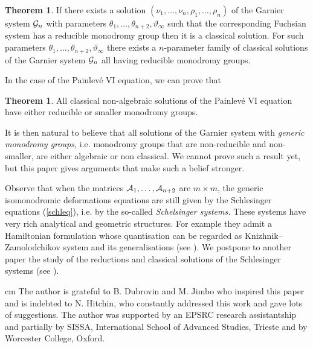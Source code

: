 \documentclass[12pt]{article}
\def\thi{{\vartheta_\infty}}
\theoremstyle{definition}
\theoremstyle{theorem}
\newtheorem{thm}[df]{Theorem}
\begin{document}
\begin{thm}
If there exists a solution $(\nu_1,\dots,\nu_n,\rho_1,\dots,\rho_n)$
of the Garnier system ${\cal G}_{n}$ with parameters 
$\theta_1,\dots,\theta_{n+2},\thi$ such that the corresponding 
Fuchsian system has a reducible monodromy group then it is a 
classical solution. For such parameters 
$\theta_1,\dots,\theta_{n+2},\thi$ there exists a $n$-parameter family
of classical solutions of the Garnier system ${\cal G}_{n}$ all having
reducible monodromy groups.
\label{mainthmred}\end{thm}

In the case of the Painlev\'e VI equation, we can prove that

\begin{thm}
All classical non-algebraic solutions of the Painlev\'e VI equation  
have either reducible or smaller monodromy groups.
\label{thmio}\end{thm}

It is then natural to believe that all solutions of the Garnier system 
with {\it generic monodromy groups,}\/ i.e. monodromy groups that 
are non-reducible and non-smaller, are either algebraic or non
classical. We cannot prove such a result yet, but this paper gives 
arguments that make such a belief stronger.

Observe that when the matrices ${\cal A}_1,\dots,{\cal A}_{n+2}$
are $m\times m$, the generic isomonodromic deformations equations are
still given by the Schlesinger equations (\ref{schleq}), i.e. by 
the so-called {\it Schelsinger systems.}\/ These systems have very 
rich analytical and geometric structures. For example they admit a 
Hamiltonian formulation whose quantisation can be regarded as 
Knizhnik--Zamolodchikov system and its generalisations (see \cite{Res}).
We postpone to another paper the study of the reductions and
classical solutions of the Schlesinger systems (see \cite{DM1}).


 cm
 The author is grateful to
B. Dubrovin and M. Jimbo who inspired this paper and is indebted to
N. Hitchin, who constantly addressed this work and gave lots of 
suggestions. The author was supported by an EPSRC research 
assistantship and partially by SISSA, International School of Advanced
Studies, Trieste and by Worcester College, Oxford. 






\end{document}
